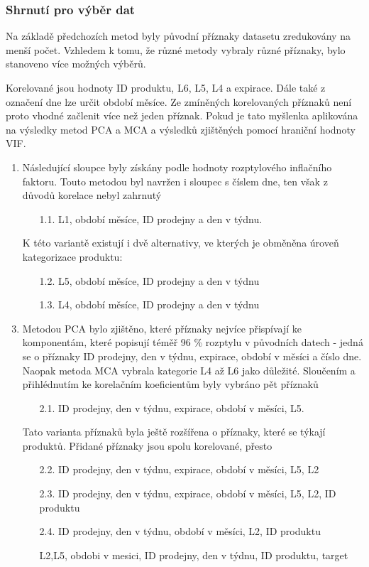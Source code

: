 \subsubsection*{Shrnutí pro výběr dat}

Na základě předchozích metod byly původní příznaky datasetu zredukovány na menší počet. Vzhledem k tomu, že různé metody vybraly různé příznaky, bylo stanoveno více možných výběrů.

Korelované jsou hodnoty ID produktu, L6, L5, L4 a expirace. Dále také z označení dne lze určit období měsíce. Ze zmíněných korelovaných příznaků není proto vhodné začlenit více než jeden příznak. Pokud je tato myšlenka aplikována na výsledky metod PCA a MCA a výsledků zjištěných pomocí hraniční hodnoty VIF.

\begin{enumerate}
    \item Následující sloupce byly získány podle hodnoty rozptylového inflačního faktoru. Touto metodou byl navržen i sloupec s číslem dne, ten však z důvodů korelace nebyl zahrnutý
    \begin{enumerate}
        \item[1.1.] L1, období měsíce, ID prodejny a den v týdnu.
    \end{enumerate}
    
    \item[] K této variantě existují i dvě alternativy, ve kterých je obměněna úroveň kategorizace produktu:     
    \begin{enumerate}
    \item[1.2.] L5, období měsíce, ID prodejny a den v týdnu
    \item[1.3.] L4, období měsíce, ID prodejny a den v týdnu
    \end{enumerate}
    \item Metodou PCA bylo zjištěno, které příznaky nejvíce přispívají ke komponentám, které popisují téměř 96 \% rozptylu v původních datech - jedná se o příznaky ID prodejny, den v týdnu, expirace, období v měsíci a číslo dne. Naopak metoda MCA vybrala kategorie L4 až L6 jako důležité. Sloučením a přihlédnutím ke korelačním koeficientům byly vybráno pět příznaků
    \begin{enumerate}
        \item[2.1.] ID prodejny, den v týdnu, expirace, období v měsíci, L5.
    \end{enumerate}
    \item[] Tato varianta příznaků byla ještě rozšířena o příznaky, které se týkají produktů. Přidané příznaky jsou spolu korelované, přesto 
    \begin{enumerate}
    \item[2.2.] ID prodejny, den v týdnu, expirace, období v měsíci, L5, L2
    \item[2.3.] ID prodejny, den v týdnu, expirace, období v měsíci, L5, L2, ID produktu
    \item[2.4.] ID prodejny, den v týdnu, období v měsíci, L2, ID produktu
    \item[] L2,L5, obdobi v mesici,  ID prodejny, den v týdnu, ID produktu, target
    \end{enumerate}
\end{enumerate}

